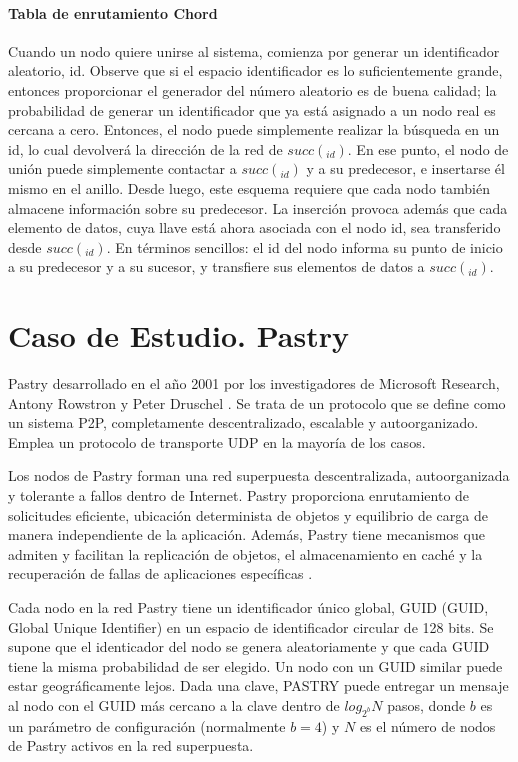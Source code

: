  

\paragraph{Tabla de enrutamiento Chord}

 Cuando un nodo quiere unirse al sistema, comienza por generar un identificador aleatorio, id. Observe que si el espacio identificador es lo suficientemente
grande, entonces proporcionar el generador del número aleatorio es de buena calidad; la probabilidad de generar un identificador que ya está asignado a un nodo real es cercana a cero.
Entonces, el nodo puede simplemente realizar la búsqueda en un id, lo cual devolverá la dirección de la red de $succ(_{id})$. En ese punto, el nodo de unión puede simplemente contactar a  $succ(_{id})$ y a su predecesor, e insertarse él mismo en el anillo. Desde luego, este esquema requiere que cada nodo también almacene información sobre su predecesor. La inserción provoca además que cada elemento de datos, cuya llave está ahora asociada con el nodo id, sea transferido desde  $succ(_{id})$.
En términos sencillos: el id del nodo informa su punto de inicio a su predecesor y a su sucesor, y transfiere sus elementos de datos a  $succ(_{id})$.

 \section{Caso de Estudio. Pastry}
 

 Pastry desarrollado en el año 2001 por los investigadores de Microsoft Research, Antony Rowstron y Peter Druschel .   Se trata de un protocolo que se define como un sistema P2P, completamente descentralizado, escalable y autoorganizado. Emplea un protocolo de transporte UDP en la mayoría de los casos.

  Los nodos de Pastry forman una red superpuesta descentralizada, autoorganizada y tolerante a fallos dentro de Internet. Pastry proporciona enrutamiento de solicitudes eficiente, ubicación determinista de objetos y equilibrio de carga de manera independiente de la aplicación. Además, Pastry tiene mecanismos que admiten y facilitan la replicación de objetos, el almacenamiento en caché y la recuperación de fallas de aplicaciones específicas \cite{Goetz2005}. 
  
Cada nodo en la red Pastry tiene un identificador único global, GUID  (GUID, Global Unique Identifier)   en un espacio de identificador circular de 128 bits. Se supone que el identicador del nodo se genera aleatoriamente y que cada GUID tiene la misma probabilidad de ser elegido. Un nodo con un GUID similar puede estar geográficamente lejos.
 Dada una clave, PASTRY puede entregar un mensaje al nodo con el GUID más cercano a la clave dentro de   $log_{2^{b}}N$ pasos, donde $b$ es un parámetro de configuración (normalmente $b = 4$) y $N$ es el número de nodos de Pastry activos en la red superpuesta.
 
